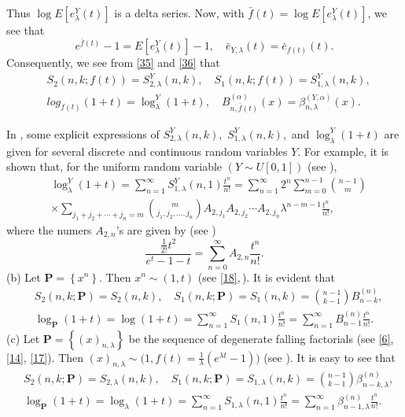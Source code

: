 \documentclass[a4paper,11pt]{amsart}
\begin{document}
Thus $\log E[e_{\lambda}^{Y}(t)]$ is a delta series. Now, with $\bar{f}(t)=\log E[e_{\lambda}^{Y}(t)]$, we see that
\begin{equation} \label{36}
e^{\bar{f}(t)}-1=E[e_{\lambda}^{Y}(t)]-1,\quad \bar{e}_{Y,\lambda}(t)=\bar{e}_{f(t)}(t).
\end{equation}
Consequently, we see from \eqref{35} and \eqref{36} that
\begin{align*}
&S_{2}(n,k; f(t))=S_{2,\lambda}^{Y}(n,k), \quad S_{1}(n,k; f(t))=S_{1,\lambda}^{Y}(n,k),\\
&log_{f(t)}(1+t)=\log_{\lambda}^{Y}(1+t), \quad B_{n,\bar{f}(t)}^{(\alpha)}(x)=\beta_{n,\lambda}^{(Y,\alpha)}(x).
\end{align*} \par
In \cite{9}, some explicit expressions of $S_{2,\lambda}^{Y}(n,k),\,\, S_{1,\lambda}^{Y}(n,k)$,\, and $\log_{\lambda}^{Y}(1+t)$ are given for several discrete and continuous random variables $Y$. For example, it is shown that, for the uniform random variable $(Y \sim U[0,1])$ (see \cite{26}),
\begin{align*}
&\log_{\lambda}^{Y}(1+t)=\sum_{n=1}^{\infty}S_{1,\lambda}^{Y}(n,1)\frac{t^{n}}{n!}=\sum_{n=1}^{\infty}2^{n}\sum_{m=0}^{n-1}\binom{n-1}{m} \\
&\times \sum_{j_1+j_2+\cdots+j_n=m}\binom{m}{j_1,j_2,\dots,j_n}A_{2,j_1}A_{2,j_2}\cdots A_{2,j_n}\lambda^{n-m-1}\frac{t^n}{n!},
\end{align*}
where the numers $A_{2,n}$'s are given by (see \cite{10})
\begin{equation*}
\frac{\frac{1}{2!}t^{2}}{e^{t}-1-t}=\sum_{n=0}^{\infty}A_{2,n}\frac{t^{n}}{n!}.
\end{equation*}
(b) Let $\mathbf{P}=\left\{x^{n}\right\}$. Then $x^{n} \sim (1,t)$ (see \eqref{18},\,\cite{5,24,25}). It is evident that 
\begin{align*}
&S_{2}(n,k;\mathbf{P})=S_{2}(n,k),\quad S_{1}(n,k;\mathbf{P})=S_{1}(n,k)=\binom{n-1}{k-1}B_{n-k}^{(n)}, \\
& \log_{\mathbf{P}}(1+t)=\log(1+t)=\sum_{n=1}^{\infty}S_{1}(n,1)\frac{t^n}{n!}=\sum_{n=1}^{\infty}B_{n-1}^{(n)}\frac{t^{n}}{n!}.
\end{align*}
(c) Let $\mathbf{P}=\left\{(x)_{n,\lambda}\right\}$ be the sequence of degenerate falling factorials (see \eqref{6}, \eqref{14}, \eqref{17}). Then $(x)_{n,\lambda} \sim \big(1, f(t)=\frac{1}{\lambda}(e^{\lambda t}-1)\big)$ (see \cite{17,19}). It is easy to see that
\begin{align*}
&S_{2}(n,k;\mathbf{P})=S_{2,\lambda}(n,k),\quad S_{1}(n,k;\mathbf{P})=S_{1,\lambda}(n,k)=\binom{n-1}{k-1}\beta_{n-k,\lambda}^{(n)},\\
&\log_{\mathbf{P}}(1+t)=\log_{\lambda}(1+t)=\sum_{n=1}^{\infty}S_{1,\lambda}(n,1)\frac{t^{n}}{n!}=\sum_{n=1}^{\infty}\beta_{n-1,\lambda}^{(n)}\frac{t^{n}}{n!}.
\end{align*}
\end{document}
